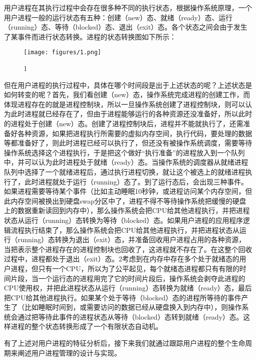 用户进程在其执行过程中会存在很多种不同的执行状态，根据操作系统原理，一个用户进程一般的运行状态有五种：创建（new）态、就绪（ready）态、运行（running）态、等待（blocked）态、退出（exit）态。各个状态之间会由于发生了某事件而进行状态转换。进程的状态转换图如下所示：

\begin{figure}[htbp]
\centering
\texttt{[image: figures/1.png]}
\caption{1}
\end{figure}

但在用户进程的执行过程中，具体在哪个时间段是出于上述状态的呢？上述状态是如何转变的呢？首先，我们看创建（new）态，操作系统完成进程的创建工作，而体现进程存在的就是进程控制块，所以一旦操作系统创建了进程控制块，则可以认为此时进程就已经存在了，但由于进程能够运行的各种资源还没准备好，所以此时的进程处于创建（new）态。创建了进程控制块后，进程并不能就执行了，还需准备好各种资源，如果把进程执行所需要的虚拟内存空间，执行代码，要处理的数据等都准备好了，则此时进程已经可以执行了，但还没有被操作系统调度，需要等待操作系统选择这个进程执行，于是把这个做好``执行准备''的进程放入到一个队列中，并可以认为此时进程处于就绪（ready）态。当操作系统的调度器从就绪进程队列中选择了一个就绪进程后，通过执行进程切换，就让这个被选上的就绪进程执行了，此时进程就处于运行（running）态了。到了运行态后，会出现三种事件。如果进程需要等待某个事件（比如主动睡眠10秒钟，或进程访问某个内存空间，但此内存空间被换出到硬盘swap分区中了，进程不得不等待操作系统把缓慢的硬盘上的数据重新读回到内存中），那么操作系统会把CPU给其他进程执行，并把进程状态从运行（running）态转换为等待（blocked）态。如果用户进程的应用程序逻辑流程执行结束了，那么操作系统会把CPU给其他进程执行，并把进程状态从运行（running）态转换为退出（exit）态，并准备回收用户进程占用的各种资源，当把表示整个进程存在的进程控制块也回收了，这进程就不存在了。在这整个回收过程中，进程都处于退出（exit）态。2考虑到在内存中存在多个处于就绪态的用户进程，但只有一个CPU，所以为了公平起见，每个就绪态进程都只有有限的时间片段，当一个运行态的进程用完了它的时间片段后，操作系统会剥夺此进程的CPU使用权，并把此进程状态从运行（running）态转换为就绪（ready）态，最后把CPU给其他进程执行。如果某个处于等待（blocked）态的进程所等待的事件产生了（比如睡眠时间到，或需要访问的数据已经从硬盘换入到内存中），则操作系统会通过把等待此事件的进程状态从等待（blocked）态转到就绪（ready）态。这样进程的整个状态转换形成了一个有限状态自动机。

有了上述对用户进程的特征分析后，接下来我们就通过跟踪用户进程的整个生命周期来阐述用户进程管理的设计与实现。
